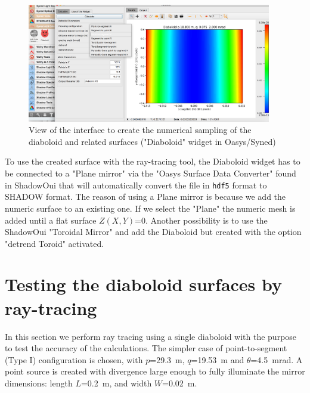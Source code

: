 \documentclass{iucr}              %
\begin{document}
\begin{figure}\label{fig:widget}
\centering
\includegraphics[width=0.95\textwidth]{figures/widget.png}
\caption{View of the interface to create the numerical sampling of the diaboloid and related surfaces ("Diaboloid" widget in Oasys/Syned) }
\end{figure}

To use the created surface with the ray-tracing tool, the Diaboloid widget has to be connected to a "Plane mirror" via the "Oasys Surface Data Converter" found in ShadowOui that will automatically convert the file in {\tt hdf5} format to SHADOW format. The reason of using a Plane mirror is because we add the numeric surface to an existing one. If we select the "Plane" the numeric mesh is added until a flat surface $Z(X,Y)$=0. Another possibility is to use the ShadowOui "Toroidal Mirror" and add the Diaboloid but created with the option "detrend Toroid" activated.  

\section{Testing the diaboloid surfaces by ray-tracing}
\label{sec:testing}

In this section we perform ray tracing using a single diaboloid with the purpose to test the accuracy of the calculations. The simpler case of point-to-segment (Type I) configuration is chosen, with $p$=29.3~m, $q$=19.53~m and $\theta$=4.5~mrad. A point source is created with divergence large enough to fully illuminate the mirror dimensions: 
length $L$=0.2~m, and width $W$=0.02~m.
\end{document}

